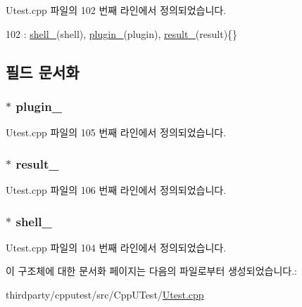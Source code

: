 Utest.\+cpp 파일의 102 번째 라인에서 정의되었습니다.


\begin{DoxyCode}
102 : \hyperlink{struct_helper_test_run_info_aeb9aa43419855db2a965ee40bbbb380c}{shell\_}(shell), \hyperlink{struct_helper_test_run_info_ad8164b153318116062bfd263486addff}{plugin\_}(plugin), \hyperlink{struct_helper_test_run_info_acf81b99797e96c7d602ffc4c3cb012b0}{result\_}(result)\{\}
\end{DoxyCode}


\subsection{필드 문서화}
\subsubsection[{\texorpdfstring{plugin\+\_\+}{plugin_}}]{$\ast$ plugin\+\_\+}\hypertarget{struct_helper_test_run_info_ad8164b153318116062bfd263486addff}{}\label{struct_helper_test_run_info_ad8164b153318116062bfd263486addff}


Utest.\+cpp 파일의 105 번째 라인에서 정의되었습니다.

\subsubsection[{\texorpdfstring{result\+\_\+}{result_}}]{$\ast$ result\+\_\+}\hypertarget{struct_helper_test_run_info_acf81b99797e96c7d602ffc4c3cb012b0}{}\label{struct_helper_test_run_info_acf81b99797e96c7d602ffc4c3cb012b0}


Utest.\+cpp 파일의 106 번째 라인에서 정의되었습니다.

\subsubsection[{\texorpdfstring{shell\+\_\+}{shell_}}]{$\ast$ shell\+\_\+}\hypertarget{struct_helper_test_run_info_aeb9aa43419855db2a965ee40bbbb380c}{}\label{struct_helper_test_run_info_aeb9aa43419855db2a965ee40bbbb380c}


Utest.\+cpp 파일의 104 번째 라인에서 정의되었습니다.



이 구조체에 대한 문서화 페이지는 다음의 파일로부터 생성되었습니다.\+:\begin{DoxyCompactItemize}
\item 
thirdparty/cpputest/src/\+Cpp\+U\+Test/\hyperlink{_utest_8cpp}{Utest.\+cpp}\end{DoxyCompactItemize}
